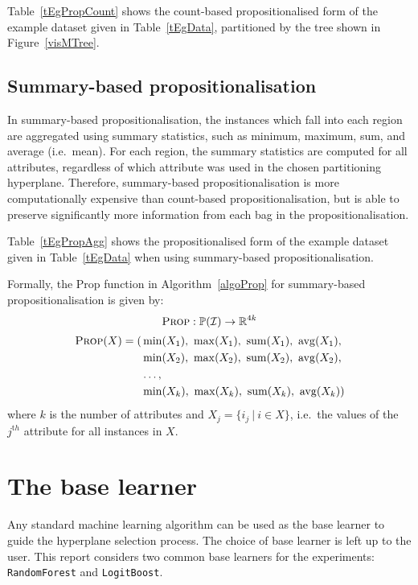 \documentclass[a4paper,12pt]{report} %
\newcommand{\real}{\mathbb{R}}
\newcommand{\mcl}[1]{\mathcal{#1}}
\newcommand{\power}{\mathbb{P}}
\newcommand{\blRF}{\texttt{RandomForest}\xspace}
\newcommand{\blLB}{\texttt{LogitBoost}\xspace}
\DeclareMathOperator{\avg}{avg}
\DeclareMathOperator{\tsum}{sum}
\begin{document}
Table~\ref{tEgPropCount} shows the count-based propositionalised form of 
    the example dataset given in Table~\ref{tEgData}, 
    partitioned by the tree shown in Figure~\ref{visMTree}.

\subsection{Summary-based propositionalisation}
\label{ssecPropSumm}

In summary-based propositionalisation, 
    the instances which fall into each region  
    are aggregated using summary statistics, such as
    minimum, maximum, sum, and average (i.e.\ mean).
For each region, the summary statistics are computed 
    for all attributes, regardless of which attribute was 
    used in the chosen partitioning hyperplane.
Therefore, summary-based propositionalisation is more
    computationally expensive than count-based propositionalisation, 
    but is able to preserve significantly more information from each bag 
    in the propositionalisation.

Table~\ref{tEgPropAgg} shows the propositionalised form of 
    the example dataset given in Table~\ref{tEgData} when
    using summary-based propositionalisation.   
    
Formally, the {\sc Prop} function in Algorithm~\ref{algoProp} 
    for summary-based propositionalisation is given by:
$$ \textrm{\sc Prop}:\power(\mcl{I}) \to \real^{4k}  $$
\begin{align*}
    \textrm{\sc Prop}(X) = (
        &\min(X_1),~\max(X_1),~\tsum(X_1),~\avg(X_1), \\
        &\min(X_2),~\max(X_2),~\tsum(X_2),~\avg(X_2), \\
        &\ldots, \\
        &\min(X_k),~\max(X_k),~\tsum(X_k),~\avg(X_k))
\end{align*}
where $k$ is the number of attributes and $X_j = \{ i_j ~|~ i \in X \}$, i.e.\ 
    the values of the $j^{\mathrm th}$ attribute for all instances in $X$.
    


\section{The base learner}
\label{sec:method:base}
  
Any standard machine learning algorithm can be used 
    as the base learner to guide the hyperplane selection process.
The choice of base learner is left up to the user.
This report considers two common base learners for the experiments: 
    \blRF and \blLB.
\end{document}
